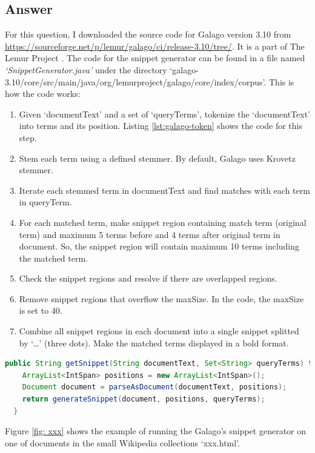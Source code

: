 \documentclass[letterpaper,11pt]{article}
\begin{document}
\subsection*{Answer}
For this question, I downloaded the source code for Galago version 3.10 \cite{galago_3.10} from \url{https://sourceforge.net/p/lemur/galago/ci/release-3.10/tree/}. It is a part of The Lemur Project \cite{lemur}. The code for the snippet generator can be found in a file named \textit{`SnippetGenerator.java'} under the directory `galago-3.10/core/src/main/java/org/lemurproject/galago/core/index/corpus'. This is how the code works:
\begin{enumerate}
\item Given `documentText' and a set of `queryTerms', tokenize the `documentText' into terms and its position. Listing \ref{lst:galago-token} shows the code for this step. 
\item Stem each term using a defined stemmer. By default, Galago uses Krovetz stemmer. 
\item Iterate each stemmed term in documentText and find matches with each term in queryTerm. 
\item For each matched term, make snippet region containing match term (original term) and maximum 5 terms before and 4 terms after original term in document. So, the snippet region will contain maximum 10 terms including the matched term. 
\item Check the snippet regions and resolve if there are overlapped regions. 
\item Remove snippet regions that overflow the maxSize. In the code, the maxSize is set to 40. 
\item Combine all snippet regions in each document into a single snippet splitted by `…' (three dots). Make the matched terms displayed in a bold format.

\end{enumerate}

\begin{lstlisting}[language=Java, caption={Tokenizing in Galago's snippet generator}, label={lst:galago-token}]
public String getSnippet(String documentText, Set<String> queryTerms) throws IOException {
    ArrayList<IntSpan> positions = new ArrayList<IntSpan>();
    Document document = parseAsDocument(documentText, positions);
    return generateSnippet(document, positions, queryTerms);
  }
\end{lstlisting}

Figure \ref{fig: xxx} shows the example of running the Galago's snippet generator on one of documents in the small Wikipedia collections `xxx.html'. 
\end{document}
